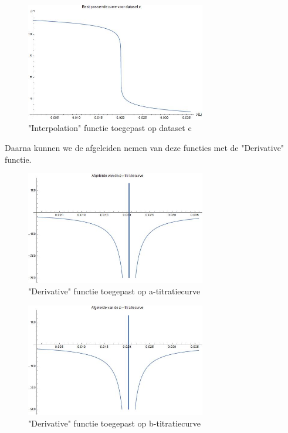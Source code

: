 \documentclass[10pt,twoside]{report}
\newcommand{\lbr}{\hfill\break}
\begin{document}
\begin{figure}[H]
    \centering
    \includegraphics[width=0.7\textwidth]{c_interpolation.jpg}
    \caption{"Interpolation" functie toegepast op dataset c}
\end{figure}
\newpage
Daarna kunnen we de afgeleiden nemen van deze functies met de "Derivative" functie.\lbr
\begin{figure}[H]
    \centering
    \includegraphics[width=0.7\textwidth]{a_derivative.jpg}
    \caption{"Derivative" functie toegepast op a-titratiecurve}
\end{figure}
\begin{figure}[H]
    \centering
    \includegraphics[width=0.7\textwidth]{b_derivative.jpg}
    \caption{"Derivative" functie toegepast op b-titratiecurve}
\end{figure}
\end{document}
